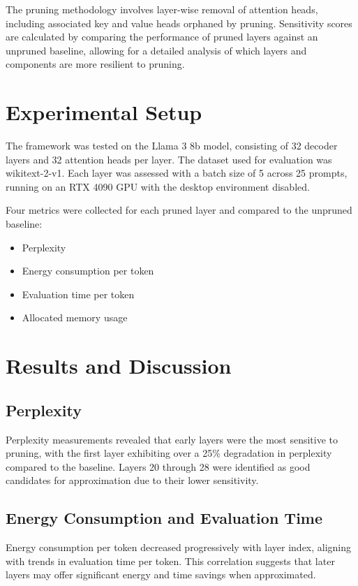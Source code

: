 \documentclass[conference]{IEEEtran}
\begin{document}
    The pruning methodology involves layer-wise removal of attention heads, including associated key and value heads orphaned by pruning. Sensitivity scores are calculated by comparing the performance of pruned layers against an unpruned baseline, allowing for a detailed analysis of which layers and components are more resilient to pruning.

    \section{Experimental Setup}
    The framework was tested on the Llama 3 8b model, consisting of 32 decoder layers and 32 attention heads per layer. The dataset used for evaluation was wikitext-2-v1. Each layer was assessed with a batch size of 5 across 25 prompts, running on an RTX 4090 GPU with the desktop environment disabled.

    Four metrics were collected for each pruned layer and compared to the unpruned baseline:
    \begin{itemize}
        \item Perplexity
        \item Energy consumption per token
        \item Evaluation time per token
        \item Allocated memory usage
    \end{itemize}

    \section{Results and Discussion}
    \subsection{Perplexity}
    Perplexity measurements revealed that early layers were the most sensitive to pruning, with the first layer exhibiting over a 25\% degradation in perplexity compared to the baseline. Layers 20 through 28 were identified as good candidates for approximation due to their lower sensitivity.

    \subsection{Energy Consumption and Evaluation Time}
    Energy consumption per token decreased progressively with layer index, aligning with trends in evaluation time per token. This correlation suggests that later layers may offer significant energy and time savings when approximated.
\end{document}
